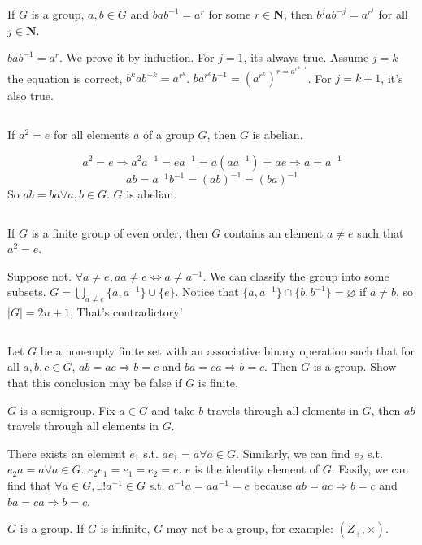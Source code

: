 $$ $$

\begin{ex}
    If $G$ is a group, $a,b\in G$ and $bab^{-1}=a^{r}$ for some $r\in \mathbf{N}$, then $b^{j}ab^{-j}=a^{r^{j}}$ for all $j\in \mathbf{N}$. 
\end{ex}

\begin{answer}
    $bab^{-1}= a^{r}$. We prove it by induction. For $j=1$, its always true. Assume $j=k$ the equation is correct, $b^{k}ab^{-k}=a^{r^{k}}$. $ba^{r^{k}}b^{-1}=(a^{r^{k}})^{r=a^{r^{k+1}}}$. For $j=k+1$, it's also true.
\end{answer}

$$ $$

\begin{ex}
    If $a^{2}=e$ for all elements $a$ of a group $G$, then $G$ is abelian.
\end{ex}

\begin{answer}
    \[a^{2}=e\Rightarrow a^{2}a^{-1}=ea^{-1}=a(aa^{-1})=ae\Rightarrow a=a^{-1}\]\[ab=a^{-1}b^{-1}=(ab)^{-1}=(ba)^{-1}\]So  $ab=ba \forall a,b \in G$. $G$ is abelian.
\end{answer}

$$ $$

\begin{ex}
    If $G$ is a finite group of even order, then $G$ contains an element $a\neq e$ such that $a^{2}=e$.
\end{ex}

\begin{answer}
    Suppose not. $\forall a\neq e, aa\neq e \Leftrightarrow a\neq a^{-1}$. We can classify the group into some subsets. $G=\bigcup\limits_{a\neq e}\{a,a^{-1}\}\cup\{e\}$. Notice that $\{a,a^{-1}\}\cap\{b,b^{-1}\}=\varnothing$ if $a\neq b$, so $\left| G \right| =2n+1$, That's contradictory!
\end{answer}

$$ $$

\begin{ex}
    Let $G$ be a nonempty finite set with an associative binary operation such that for all $a, b, c\in G$, $ab = ac\Rightarrow b = c$ and $ba  =ca \Rightarrow b = c$. Then $G$ is a group. Show that this conclusion may be false if $G$ is finite.
\end{ex}

\begin{answer}
    $G$ is a semigroup. Fix $a\in G$ and take $b$ travels through all elements in $G$, then $ab$ travels through all elements in $G$.

    There exists an element $e_1$ s.t. $ae_1=a\forall a\in G$. Similarly, we can find $e_2$ s.t. $e_2a=a\forall a\in G$. $e_2e_1=e_1=e_2=e$. $e$ is the identity element of $G$. Easily, we can find that $\forall a\in G, \exists ! a^{-1}\in G$ s.t. $a^{-1}a=aa^{-1}=e$ because $ab = ac\Rightarrow b = c$ and $ba  =ca \Rightarrow b = c$.

    $G$ is a group. If $G$ is infinite, $G$ may not be a group, for example: $(Z_+,\times)$.
\end{answer}

